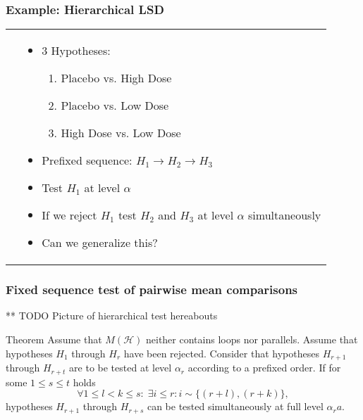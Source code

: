 \documentclass[bigger]{beamer}
\begin{document}
\begin{frame}
 \frametitle{Example: Hierarchical LSD}
\begin{tabular}{ll}
 \begin{minipage}{.4\textwidth}
   
 \end{minipage} &
 \begin{minipage}{.6\textwidth}
   \begin{itemize}
   \item 3 Hypotheses:
     \begin{enumerate}
     \item Placebo vs. High Dose
     \item Placebo vs. Low Dose
     \item High Dose vs. Low Dose
     \end{enumerate}
   \item Prefixed sequence: $H_1 \rightarrow H_2 \rightarrow H_3$
   \item Test $H_1$ at level $\alpha$
   \item If we reject $H_1$ test $H_2$ and $H_3$ at level $\alpha$
     simultaneously
   \item Can we generalize this?
   \end{itemize}
 \end{minipage}
\end{tabular}

\end{frame}

\begin{frame}
 \frametitle{Fixed sequence test of pairwise mean comparisons}

** TODO Picture of hierarchical test hereabouts


\begin{block}{Theorem}
 Assume that $M(\mathscr{H})$ neither contains loops nor
 parallels. Assume that hypotheses $H_1$ through $H_r$ have been
 rejected. Consider that hypotheses $H_{r+1}$ through $H_{r+t}$ are
 to be tested at level $\alpha_r$ according to a prefixed order.  If
 for some $1 \leq s \leq t$ holds
 \begin{equation}
   \label{eq:cond.hierarchical}
   \forall 1 \leq l < k \leq s: \; \exists i \leq r: i \sim \{(r+l),(r+k)\},
 \end{equation}
 hypotheses $H_{r+1}$ through $H_{r+s}$ can be tested simultaneously
 at full level $\alpha_ra$.
\end{block}

\end{frame}
\end{document}
